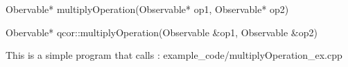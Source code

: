 
\begin{apidefinition}

\begin{Csynopsis}
    Obervable* multiplyOperation(Observable* op1, Observable* op2)
\end{Csynopsis}

\begin{Cppsynopsis}
    Obervable* qcor::multiplyOperation(Observable &op1, Observable &op2)
\end{Cppsynopsis}


\begin{apiarguments}
\end{apiarguments}



\apinotes{
    
}

\begin{apiexamples}

\apicppexample
    { This is a simple program that calls : } 
    { example_code/multiplyOperation_ex.cpp} 
    {}

\end{apiexamples}

\end{apidefinition}
